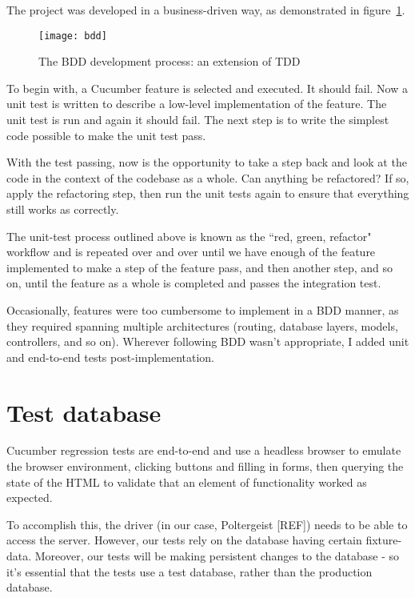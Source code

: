 The project was developed in a business-driven way, as demonstrated in figure~\ref{uml:bdd}.

\begin{figure}[h!]
  \centering
    \ifimages
    \texttt{[image: bdd]}
    \fi
  \caption{The BDD development process: an extension of TDD}
  \label{uml:bdd}
\end{figure}

To begin with, a Cucumber feature is selected and executed. It should fail. Now a unit test is written to describe a low-level implementation of the feature. The unit test is run and again it should fail. The next step is to write the simplest code possible to make the unit test pass.

With the test passing, now is the opportunity to take a step back and look at the code in the context of the codebase as a whole. Can anything be refactored? If so, apply the refactoring step, then run the unit tests again to ensure that everything still works as correctly.

The unit-test process outlined above is known as the ``red, green, refactor" workflow and is repeated over and over until we have enough of the feature implemented to make a step of the feature pass, and then another step, and so on, until the feature as a whole is completed and passes the integration test.

Occasionally, features were too cumbersome to implement in a BDD manner, as they required spanning multiple architectures (routing, database layers, models, controllers, and so on). Wherever following BDD wasn't appropriate, I added unit and end-to-end tests post-implementation.

\section{Test database}

Cucumber regression tests are end-to-end and use a headless browser to emulate the browser environment, clicking buttons and filling in forms, then querying the state of the HTML to validate that an element of functionality worked as expected.

To accomplish this, the driver (in our case, Poltergeist [REF]) needs to be able to access the server. However, our tests rely on the database having certain fixture-data. Moreover, our tests will be making persistent changes to the database - so it's essential that the tests use a test database, rather than the production database.

